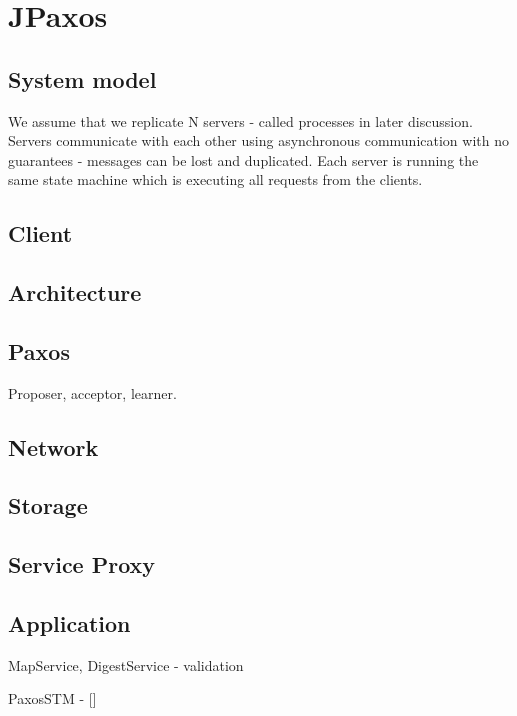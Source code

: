 
\chapter{JPaxos}

\section{System model}

We assume that we replicate N servers - called processes in later discussion.
Servers communicate with each other using asynchronous communication with no
guarantees - messages can be lost and duplicated. Each server is running the
same state machine which is executing all requests from the clients.

\section{Client}

\section{Architecture}

\section{Paxos}
Proposer, acceptor, learner.

\section{Network}
\label{sec:network}

\section{Storage}

\section{Service Proxy}
\label{sec:service_proxy}

\section{Application}
MapService, DigestService - validation

PaxosSTM - []

